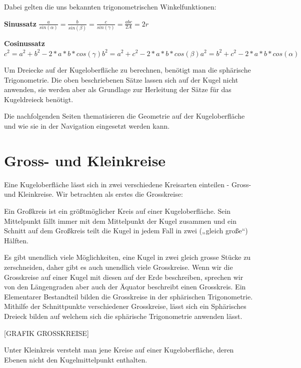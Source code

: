 \begin{refsection}
Dabei gelten die uns bekannten trigonometrischen Winkelfunktionen:

\textbf{Sinussatz}
$\frac{ a }{ sin(\alpha) } = \frac{ b }{sin(\beta)} = \frac{ c }{ sin(\gamma) } = \frac{abc}{2A} = 2r$

\textbf{Cosinussatz}
$c^{ 2 } = a^{ 2 } + b^{ 2 } - 2*a*b*cos(\gamma)
b^{ 2 } = a^{ 2 } + c^{ 2 } - 2*a*b*cos(\beta)
a^{ 2 } = b^{ 2 } + c^{ 2 } - 2*a*b*cos(\alpha)$

Um Dreiecke auf der Kugeloberfläche zu berechnen, benötigt man die sphärische Trigonometrie. Die oben beschriebenen Sätze lassen sich auf der Kugel nicht anwenden, sie werden aber als Grundlage zur Herleitung der Sätze für das Kugeldreieck benötigt.

Die nachfolgenden Seiten thematisieren die Geometrie auf der Kugeloberfläche und wie sie in der Navigation eingesetzt werden kann.


\section{Gross- und Kleinkreise}

Eine Kugeloberfläche lässt sich in zwei verschiedene Kreisarten einteilen -  Gross- und Kleinkreise. 
Wir betrachten als erstes die Grosskreise:

\begin{definition}
Ein Großkreis ist ein größtmöglicher Kreis auf einer Kugeloberfläche. Sein Mittelpunkt fällt immer mit dem Mittelpunkt der Kugel zusammen und ein Schnitt auf dem Großkreis teilt die Kugel in jedem Fall in zwei („gleich große“) Hälften.
\end{definition}

Es gibt unendlich viele Möglichkeiten, eine Kugel in zwei gleich grosse Stücke zu zerschneiden, 
daher gibt es auch unendlich viele Grosskreise. Wenn wir die Grosskreise auf einer Kugel mit diesen auf der Erde beschreiben, sprechen wir von den Längengraden aber auch der Äquator beschreibt einen Grosskreis.
Ein Elementarer Bestandteil bilden die Grosskreise in der sphärischen Trigonometrie. Mithilfe der Schnittpunkte verschiedener Grosskreise, lässt sich ein Sphärisches Dreieck bilden auf welchem sich die sphärische Trigonometrie anwenden lässt.

[GRAFIK GROSSKREISE]

\begin{definition}
Unter Kleinkreis versteht man jene Kreise auf einer Kugeloberfläche, deren Ebenen nicht den Kugelmittelpunkt enthalten.
\end{definition}


\end{refsection}
